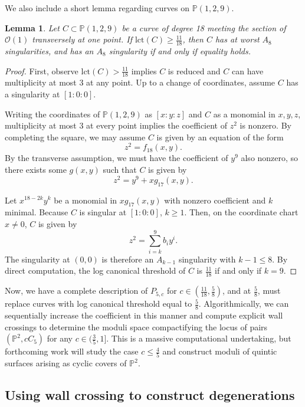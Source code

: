 \documentclass[11pt]{amsart}
\numberwithin{equation}{section}
\newtheorem{lemma}[theorem]{Lemma}
\theoremstyle{definition}
\newcommand{\bP}{\mathbb{P}}
\newcommand{\calO}{\mathcal{O}}
\newcommand{\lct}{\mathrm{lct}}
\begin{document}
We also include a short lemma regarding curves on $\bP(1,2,9)$.

\begin{lemma}\label{lem:p129}
    Let $C \subset \bP(1,2,9)$ be a curve of degree 18 meeting the section of $\calO(1)$ transversely at one point.  If $\lct(C) \ge \frac{11}{18}$, then $C$ has at worst $A_8$ singularities, and has an $A_8$ singularity if and only if equality holds.
\end{lemma}

\begin{proof}
    First, observe $\lct(C) > \frac{11}{18}$ implies $C$ is reduced and $C$ can have multiplicity at most 3 at any point.  Up to a change of coordinates, assume $C$ has a singularity at $[1:0:0]$. 
    
    Writing the coordinates of $\bP(1,2,9)$ as $[x:y:z]$ and $C$ as a monomial in $x,y,z$, multiplicity at most 3 at every point implies the coefficient of $z^2$ is nonzero.  By completing the square, we may assume $C$ is given by an equation of the form 
    \[ z^2 = f_{18}(x,y).\]
    By the transverse assumption, we must have the coefficient of $y^9$ also nonzero, so there exists some $g(x,y)$ such that $C$ is given by
    \[ z^2 = y^9 + xg_{17}(x,y).\]

    Let $x^{18-2k}y^{k}$ be a monomial in $xg_{17}(x,y)$ with nonzero coefficient and $k$ minimal.  Because $C$ is singular at $[1:0:0]$, $k \ge 1$.  Then, on the coordinate chart $x \ne 0$, $C$ is given by 
    \[ z^2 = \sum_{i = k}^9 b_i y^i. \]
    The singularity at $(0,0)$ is therefore an $A_{k-1}$ singularity with $k-1 \le 8$.  By direct computation, the log canonical threshold of $C$ is $\frac{11}{18}$ if and only if $k = 9$.
\end{proof}



Now, we have a complete description of $P_{5,c}$ for $c \in (\frac{11}{18},\frac{5}{8})$, and at $\frac{5}{8}$, must replace curves with log canonical threshold equal to $\frac{5}{8}$.  Algorithmically, we can sequentially increase the coefficient in this manner and compute explicit wall crossings to determine the moduli space compactifying the locus of pairs  $(\bP^2, cC_5)$ for any $c \in (\frac{3}{5},1]$.  This is a massive computational undertaking, but forthcoming work will study the case $c \le \frac{4}{5}$ and construct moduli of quintic surfaces arising as cyclic covers of $\bP^2$.



\subsection{Using wall crossing to construct degenerations}
\end{document}
